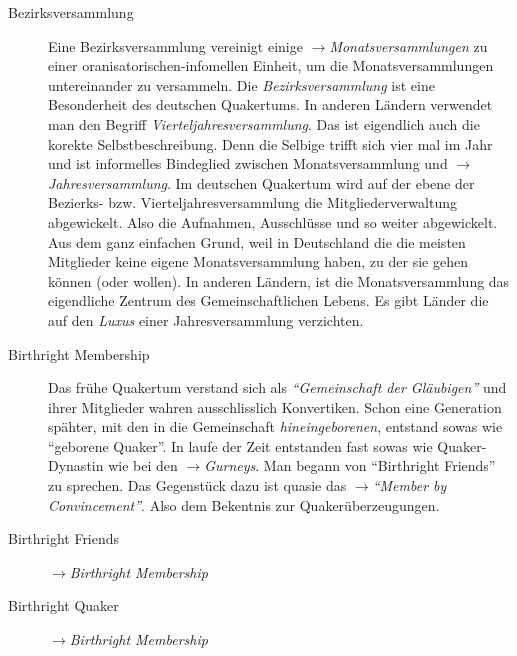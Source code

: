 \begin{description}
 \item[Bezirksversammlung] Eine Bezirksversammlung vereinigt einige $\to$\textit{Monatsversammlungen} zu einer oranisatorischen-infomellen Einheit, um die Monatsversammlungen untereinander zu versammeln. Die \textit{Bezirksversammlung} ist eine Besonderheit des deutschen Quakertums. In anderen Ländern verwendet man den Begriff \textit{Vierteljahresversammlung}. Das ist eigendlich auch die korekte Selbstbeschreibung. Denn die Selbige trifft sich vier mal im Jahr und ist informelles Bindeglied zwischen Monatsversammlung und $\to$\textit{Jahresversammlung}. Im deutschen Quakertum wird auf der ebene der Bezierks- bzw. Vierteljahresversammlung die Mitgliederverwaltung abgewickelt. Also die Aufnahmen, Ausschlüsse und so weiter abgewickelt. Aus dem ganz einfachen Grund, weil in Deutschland die die meisten Mitglieder keine eigene Monatsversammlung haben, zu der sie gehen können (oder wollen). In anderen Ländern, ist die Monatsversammlung das eigendliche Zentrum des Gemeinschaftlichen Lebens. Es gibt Länder die auf den \textit{Luxus} einer Jahresversammlung verzichten.
 
 \item[Birthright Membership] Das frühe Quakertum verstand sich als \textit{"`Gemeinschaft der Gläubigen"'} und ihrer Mitglieder wahren ausschlisslich Konvertiken. Schon eine Generation spähter, mit den in die Gemeinschaft \textit{hineingeborenen}, entstand sowas wie "`geborene Quaker"'. In laufe der Zeit entstanden fast sowas wie Quaker-Dynastin wie bei den $\to$\textit{Gurneys}. Man begann von "`Birthright Friends"' zu sprechen. Das Gegenstück dazu ist quasie das $\to$\textit{"`Member by Convincement"'}. Also dem Bekentnis zur Quakerüberzeugungen.
 
 \item[Birthright Friends] $\to$\textit{Birthright Membership}
 
 \item[Birthright Quaker] $\to$\textit{Birthright Membership}


\end{description}
